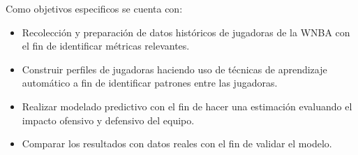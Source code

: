 Como objetivos especificos se cuenta con:
\begin{itemize}
    \item Recolección y preparación de datos históricos de jugadoras de la WNBA con el fin de identificar
    métricas relevantes.
    \item Construir perfiles de jugadoras haciendo uso de técnicas de aprendizaje automático a fin de identificar
    patrones entre las jugadoras.
    \item Realizar modelado predictivo con el fin de hacer una estimación evaluando el impacto ofensivo y
    defensivo del equipo.
    \item Comparar los resultados con datos reales con el fin de validar el modelo.
\end{itemize}